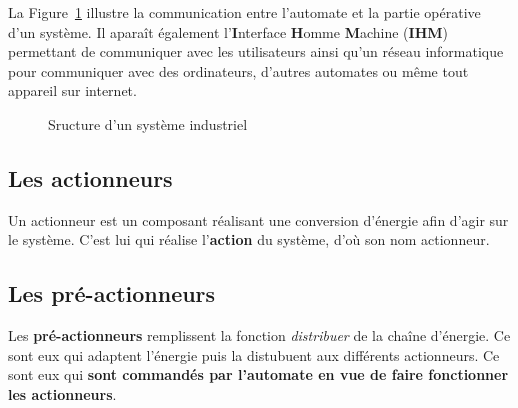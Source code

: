 \documentclass[11pt]{article}
\begin{document}
La Figure~\ref{fig:structureAPI} illustre la communication entre l'automate et la partie opérative d'un système. Il aparaît également l'\textbf{I}nterface \textbf{H}omme \textbf{M}achine (\textbf{IHM}) permettant de communiquer avec les utilisateurs ainsi qu'un réseau informatique pour communiquer avec des ordinateurs, d'autres automates ou même tout appareil sur internet.

\begin{figure}[ht]
	\centering
	
	\caption{Sructure d'un système industriel}
	\label{fig:structureAPI}
\end{figure}

\subsection{Les actionneurs}
Un actionneur est un composant réalisant une conversion d'énergie afin d'agir sur le système. C'est lui qui réalise l'\textbf{action} du système, d'où son nom actionneur.


\subsection{Les pré-actionneurs}
Les \textbf{pré-actionneurs} remplissent la fonction \textit{distribuer} de la chaîne d'énergie. Ce sont eux qui  adaptent l'énergie puis la distubuent aux différents actionneurs. Ce sont eux qui \textbf{sont commandés par l'automate en vue de faire fonctionner les actionneurs}.
\end{document}
